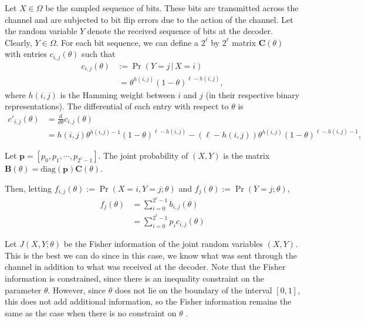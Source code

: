 \documentclass[12pt]{article}
\numberwithin{equation}{section}
\numberwithin{table}{section}
\numberwithin{figure}{section}
\newcommand{\ones}[1]{\mathbf{1}_{#1}}
\def\diag{\text{diag}}
\def\bA{\mathbf{A}}
\def\bC{\mathbf{C}}
\def\bB{\mathbf{B}}
\def\bp{\mathbf{p}}
\begin{document}
Let $X \in \Omega$ be the sampled sequence of bits. These bits are transmitted across the channel and are subjected to bit flip errors due to the
action of the channel. Let the random variable $Y$ denote the received sequence of bits at the decoder. Clearly, $Y \in \Omega$. For each bit 
sequence, we can define a $2^\ell$ by $2^\ell$ matrix $\bC(\theta)$ with entries $c_{i,j}(\theta)$ such that
\begin{align}
\nonumber
c_{i,j}(\theta) &:= \Pr(Y= j\,|\,X=i)\\
\label{eq:channel_error}
&\ = \theta^{h(i,j)} (1-\theta)^{\ell - h(i,j)},
\end{align}
where $h(i,j)$ is the Hamming weight between $i$ and $j$ (in their respective binary representations). The differential of each entry with
respect to $\theta$ is
\begin{align}
\nonumber
c'_{i,j}(\theta) &= \frac{d}{d\theta} c_{i,j}(\theta)\\
\label{eq:channel_error_diff}
&= h(i,j) \theta^{h(i,j)-1} (1-\theta)^{\ell - h(i,j)} - (\ell - h(i,j)) \theta^{h(i,j)} (1-\theta)^{\ell - h(i,j)-1},
\end{align}

Let $\bp = [p_0,p_1,\cdots,p_{2^\ell-1}]$.
The joint probability of $(X,Y)$ is the matrix $\bB(\theta) = \diag(\bp) \bC(\theta)$.

Then, letting $f_{i,j}(\theta) := \Pr(X=i,Y=j;\theta)$ and $f_{j}(\theta) := \Pr(Y=j;\theta)$,
\begin{align*}
f_j(\theta) &= \sum_{i=0}^{2^\ell-1} b_{i,j}(\theta)\\
&= \sum_{i=0}^{2^\ell-1} p_i c_{i,j}(\theta)
\end{align*}

Let $J(X,Y;\theta)$ be the Fisher information of the joint random variables $(X,Y)$. This is the best we can do since in this case, we know what
was sent through the channel in addition to what was received at the decoder. Note that the Fisher information is constrained, since there is
an inequality constraint on the parameter $\theta$. However, since $\theta$ does not lie on the boundary of the interval $[0,1]$, this does not
add additional information, so the Fisher information remains the same as the case when there is no constraint on $\theta$ 
\cite{Gorman90CRB}.
\end{document}

